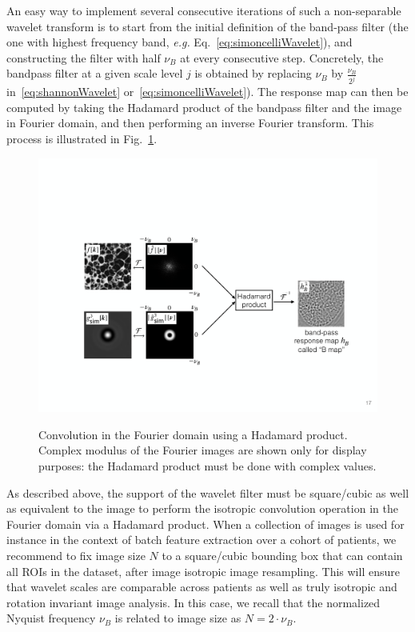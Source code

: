 \documentclass[fleqn,a4paper,oneside,openany]{book}
\begin{document}
An easy way to implement several consecutive iterations of such a non-separable wavelet transform is to start from the initial definition of the band-pass filter (the one with highest frequency band, \emph{e.g.} Eq.~\eqref{eq:simoncelliWavelet}), and constructing the filter with half $\nu_B$ at every consecutive step. Concretely, the bandpass filter at a given scale level $j$ is obtained by replacing $\nu_B$ by $\frac{\nu_B}{2^j}$ in~\eqref{eq:shannonWavelet} or~\eqref{eq:simoncelliWavelet}).
The response map can then be computed by taking the Hadamard product of the bandpass filter and the image in Fourier domain, and then performing an inverse Fourier transform.
This process is illustrated in Fig.~\ref{fig:hadamardConv}.
%
\begin{figure}
\centering
\includegraphics[trim = 0 0 0 0, clip, width=1\linewidth]{hadamardConv.pdf}\\
\caption{Convolution in the Fourier domain using a Hadamard product. Complex modulus of the Fourier images are shown only for display purposes: the Hadamard product must be done with complex values.}
  \label{fig:hadamardConv}
\end{figure}
%

As described above, the support of the wavelet filter must be square/cubic as well as equivalent to the image to perform the isotropic convolution operation in the Fourier domain via a Hadamard product. When a collection of images is used for instance in the context of batch feature extraction over a cohort of patients, we recommend to fix image size $N$ to a square/cubic bounding box that can contain all ROIs in the dataset, after image isotropic image resampling. This will ensure that wavelet scales are comparable across patients as well as truly isotropic and rotation invariant image analysis.
In this case, we recall that the normalized Nyquist frequency $\nu_B$ is related to image size as $N=2\cdot\nu_B$.
\end{document}
